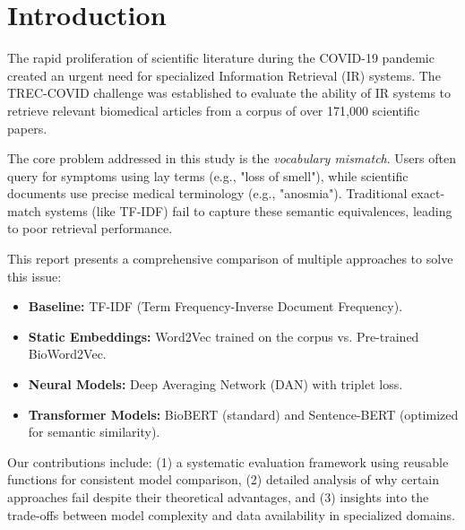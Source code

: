 \documentclass[sigconf,nonacm]{acmart}
\begin{document}


\maketitle


\section{Introduction}
The rapid proliferation of scientific literature during the COVID-19 pandemic created an urgent need for specialized Information Retrieval (IR) systems. The TREC-COVID challenge \cite{vorhees2021trec} was established to evaluate the ability of IR systems to retrieve relevant biomedical articles from a corpus of over 171,000 scientific papers.

The core problem addressed in this study is the \textit{vocabulary mismatch}. Users often query for symptoms using lay terms (e.g., "loss of smell"), while scientific documents use precise medical terminology (e.g., "anosmia"). Traditional exact-match systems (like TF-IDF) fail to capture these semantic equivalences, leading to poor retrieval performance.

This report presents a comprehensive comparison of multiple approaches to solve this issue:
\begin{itemize}
    \item \textbf{Baseline:} TF-IDF (Term Frequency-Inverse Document Frequency).
    \item \textbf{Static Embeddings:} Word2Vec trained on the corpus vs. Pre-trained BioWord2Vec.
    \item \textbf{Neural Models:} Deep Averaging Network (DAN) with triplet loss.
    \item \textbf{Transformer Models:} BioBERT (standard) and Sentence-BERT (optimized for semantic similarity).
\end{itemize}

Our contributions include: (1) a systematic evaluation framework using reusable functions for consistent model comparison, (2) detailed analysis of why certain approaches fail despite their theoretical advantages, and (3) insights into the trade-offs between model complexity and data availability in specialized domains.
\end{document}

